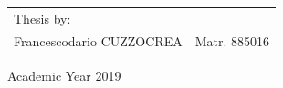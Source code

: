 \begin{titlepage}
\begin{flushright}
\begin{tabular}{ll}
Thesis by: & \tabularnewline
Francescodario CUZZOCREA & Matr. 885016\tabularnewline
\end{tabular}\vspace{4cm}
\par
\end{flushright}

\begin{center}
{\large{}Academic Year 2019}
\par
\end{center}{\large \par}

\end{titlepage}
